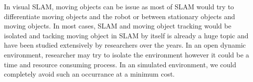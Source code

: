 In visual SLAM, moving objects can be issue as most of SLAM would try to differentiate moving objects and the robot or between stationary objects and moving objects. In most cases, SLAM and moving object tracking would be isolated and tacking moving object in SLAM by itself is already a huge topic and have been studied extensively by researchers over the years. In an open dynamic environment, researcher may try to isolate the environment however it could be a time and resource consuming process. In an simulated environment, we could completely avoid such an occurrance at a minimum cost.